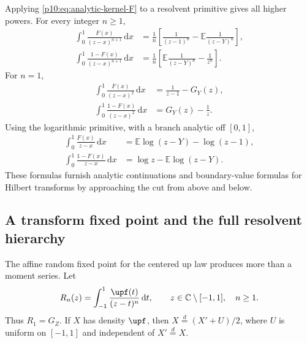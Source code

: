 \documentclass[11pt,oneside]{article}
\theoremstyle{definition}
\theoremstyle{remark}
\newcommand{\F}{F}
\newcommand{\E}{\mathbb E}
\newcommand{\C}{\mathbb C}
\newcommand{\dd}{\,\mathrm d}
\newcommand{\1}{\mathbf 1}
\begin{document}
Applying \cref{p10:eq:analytic-kernel-F} to a resolvent primitive gives all higher powers.
For every integer \(n\ge1\),
\begin{align}
 \int_0^1\frac{\F(x)}{(z-x)^{n+1}}\dd x
 &=\frac1n\left[\frac1{(z-1)^n}-\E\frac1{(z-Y)^n}\right],
 \label{p10:eq:resolvent-F-n}\\
 \int_0^1\frac{1-\F(x)}{(z-x)^{n+1}}\dd x
 &=\frac1n\left[\E\frac1{(z-Y)^n}-\frac1{z^n}\right].
 \label{p10:eq:resolvent-up-n}
\end{align}
For \(n=1\),
\begin{align}
 \int_0^1\frac{\F(x)}{(z-x)^2}\dd x
 &=\frac1{z-1}-G_Y(z),\label{p10:eq:resolvent-F-2}\\
 \int_0^1\frac{1-\F(x)}{(z-x)^2}\dd x
 &=G_Y(z)-\frac1z.\label{p10:eq:resolvent-up-2}
\end{align}
Using the logarithmic primitive, with a branch analytic off \([0,1]\),
\begin{align}
 \int_0^1\frac{\F(x)}{z-x}\dd x
 &=\E\log(z-Y)-\log(z-1),
 \label{p10:eq:log-resolvent-F}\\
 \int_0^1\frac{1-\F(x)}{z-x}\dd x
 &=\log z-\E\log(z-Y).
 \label{p10:eq:log-resolvent-up}
\end{align}
These formulas furnish analytic continuations and boundary-value formulas for Hilbert
transforms by approaching the cut from above and below.

\subsection{A transform fixed point and the full resolvent hierarchy}
\label{p10:subsec:resolvent-fixed-point}

The affine random fixed point for the centered up law produces more than a moment
series.  Let
\begin{equation}\label{p10:eq:Rn-def}
 R_n(z)=\int_{-1}^1\frac{\upf(t)}{(z-t)^n}\dd t,
 \qquad z\in\C\setminus[-1,1],\quad n\ge1.
\end{equation}
Thus \(R_1=G_Z\).  If \(X\) has density \(\upf\), then
\(X\overset d=(X'+U)/2\), where \(U\) is uniform on \([-1,1]\) and independent of
\(X'\overset d=X\).
\end{document}
